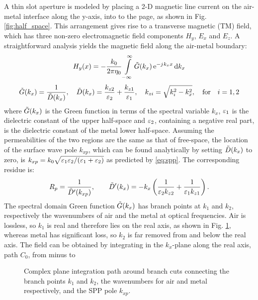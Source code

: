 A thin slot aperture is modeled by placing a 2-D magnetic line current on the air-metal interface along the y-axis, into to the page, as shown in Fig. \ref{fig:half_space}. This arrangement gives rise to a transverse magnetic (TM) field, which has three non-zero electromagnetic field components $H_y$, $E_x$ and $E_z$. A straightforward analysis yields the magnetic field along the air-metal boundary:
%
\begin{equation}
  H_y(x) =  - \frac{k_0}{2 \pi \eta_0} \int\limits_{-\infty}^\infty  \tilde{G}(k_x) \, \mathrm{e}^{ - j\mkern1mu k_x x} \mathop{}\!\mathrm{d} {k_x}
  \label{eq:Sommerfeld}
\end{equation}
%
\begin{equation}
  \tilde{G}(k_x) = \frac{1}{\tilde{D}(k_x)}, \quad
  \tilde{D}(k_x) = \frac{k_{z2}}{\varepsilon_2} + \frac{k_{z1}}{\varepsilon_1}, \quad
  k_{zi} = \sqrt{k_i^2 - k_x^2}, \quad \text{for} \quad i=1,2
  \label{eq:somm_details}
\end{equation}
%
where $\tilde{G}(k_x)$ is the Green function in terms of the spectral variable $k_x$, $\varepsilon_1$ is the dielectric constant of the upper half-space and $\varepsilon_2$, containing a negative real part, is the dielectric constant of the metal lower half-space. Assuming the permeabilities of the two regions are the same as that of free-space, the location of the surface wave pole $k_{xp}$, which can be found analytically by setting $\tilde{D}(k_x)$ to zero, is
$k_{xp} = k_0 \sqrt{ \varepsilon_1 \varepsilon_2 /{(\varepsilon_1 + \varepsilon_2)}}$ as predicted by \eqref{eq:spp}. The corresponding residue is:
%
\begin{equation}
  R_p = \frac{1}{\tilde{D}'(k_{xp})}, \qquad
  \tilde{D}'(k_x) =  -{k_x}\left( \frac{1}{\varepsilon_2 k_{z2}} + \frac{1}{\varepsilon_1 k_{z1}} \right).
  \label{eq:residue}
\end{equation}
%
The spectral domain Green function $\tilde{G}(k_x)$ has branch points at $k_1$ and  $k_2$, respectively the wavenumbers of air and the metal at optical frequencies. Air is lossless, so $k_1$ is real and therefore lies on the real axis, as shown in Fig. \ref{fig:contour}, whereas metal has significant loss, so $k_2$ is far removed from and below the real axis. The field can be obtained by integrating in the $k_x$-plane along the real axis, path $C_0$, from minus to
%
\begin{figure}[h!]
  \centering
  \def\svgwidth{.5\linewidth}
  
  \caption{Complex plane integration path around branch cuts connecting the branch points $k_1$ and $k_2$, the wavenumbers for air and metal respectively, and the SPP pole $k_{xp}$.}
  \label{fig:contour}
\end{figure}
